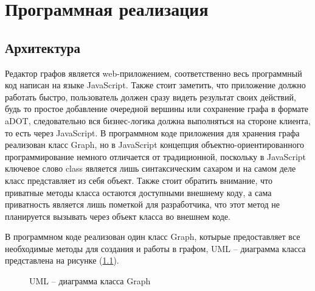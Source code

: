 \chapter{Программная реализация}\label{chap3_soft_architecture}
\section{Архитектура}\label{arch}

Редактор графов является web-приложением, соответственно весь программный код написан на языке JavaScript. Также стоит заметить, что приложение должно работать быстро, пользователь должен сразу видеть результат своих действий, будь то простое добавление очередной вершины или сохранение графа в формате aDOT, следовательно вся бизнес-логика должна выполняться на стороне клиента, то есть через JavaScript. В программном коде приложения для хранения графа реализован класс Graph, но в JavaScript концепция объектно-ориентированного программирование немного отличается от традиционной, поскольку в JavaScript ключевое слово class является лишь синтаксическим сахаром и на самом деле класс представляет из себя объект. Также стоит обратить внимание, что приватные методы класса остаются доступными внешнему коду, а сама приватность является лишь пометкой для разработчика, что этот метод не планируется вызывать через объект класса во внешнем коде.

В программном коде реализован один класс Graph, котырые предоставляет все необходимые методы для создания и работы в графом, UML -- диаграмма класса представлена на рисунке (\ref{fig:uml_chart}).

\begin{figure}[h!]
\caption{UML -- диаграмма класса Graph}
\label{fig:uml_chart}
\end{figure}

